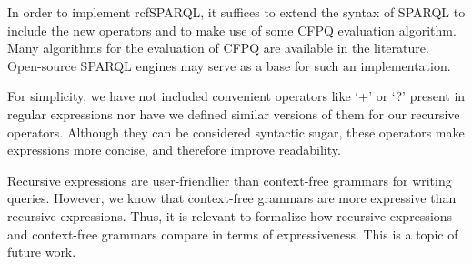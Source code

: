 \documentclass[runningheads]{llncs}
\begin{document}
In order to implement \textsf{rcfSPARQL}, it suffices to extend the syntax of SPARQL to include the new operators and to make use of some CFPQ evaluation algorithm.
Many algorithms for the evaluation of CFPQ  are available in the literature. 
Open-source SPARQL engines may serve as a base for such an implementation.

For simplicity, we have not included convenient operators like `+' or `?' present in regular expressions nor have we defined similar versions of them for our recursive operators.
Although they can be considered syntactic sugar, these operators make expressions more concise, and therefore improve readability.

Recursive expressions are user-friendlier than context-free grammars for writing queries. However, we know that context-free grammars are more expressive than recursive expressions. 
Thus, it is relevant to formalize how recursive expressions and  context-free grammars compare in terms of expressiveness.
This is a topic of future work.









%
\end{document}
